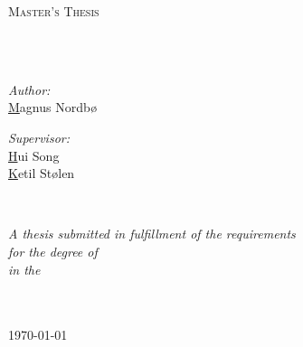 \documentclass[
	11pt, %
english, %
singlespacing, %
headsepline, %
]{MastersDoctoralThesis} %
\author{Magnus \textsc{Nordbø}} %
\begin{document}
\frontmatter %
\pagestyle{plain} %
\let\cleardoublepage\clearpage

\begin{titlepage}
	\begin{center}

		\vspace*{.06\textheight}
		{\scshape\LARGE \univname\par}\vspace{1.5cm} %
		\textsc{\Large Master's Thesis}\\[0.5cm] %

		\HRule \\[0.4cm] %
		{\huge \bfseries \ttitle\par}\vspace{0.4cm} %
		\HRule \\[1.5cm] %

		\begin{minipage}[t]{0.4\textwidth}
			\begin{flushleft} \large
				\emph{Author:}\\
				\href{https://www.linkedin.com/in/nordbom/}Magnus Nordbø %
			\end{flushleft}
		\end{minipage}
		\begin{minipage}[t]{0.4\textwidth}
			\begin{flushright} \large
				\emph{Supervisor:} \\
				\href{https://www.sintef.no/en/all-employees/employee/hui.song/}Hui Song\\ %
				\href{https://breibakk.no/}Ketil Stølen
			\end{flushright}
		\end{minipage}\\[3cm]

		\vfill

		\large \textit{A thesis submitted in fulfillment of the requirements\\ for the degree of \degreename}\\[0.3cm] %
		\textit{in the}\\[0.4cm]
		\groupname\\\deptname\\[2cm] %

		\vfill

		{\large \today}\\[4cm] %

		\vfill
	\end{center}
\end{titlepage}
\end{document}
